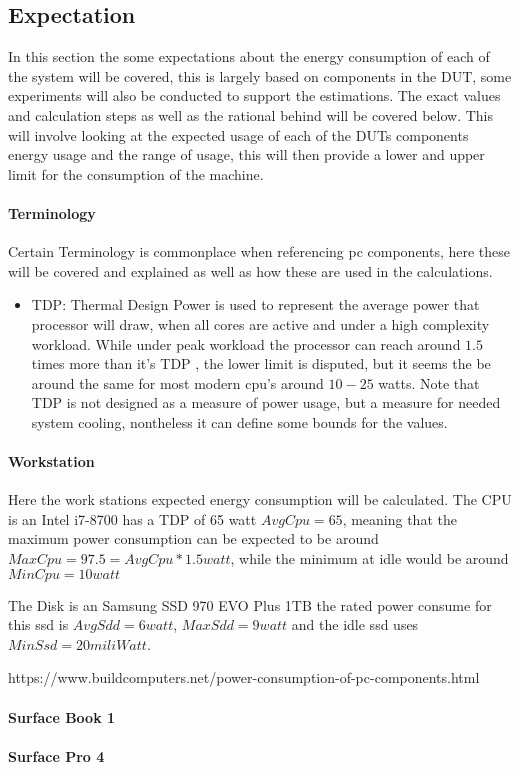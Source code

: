 \subsection{Expectation}
In this section the some expectations about the energy consumption of each of the system will be covered, this is largely based on components in the DUT, some experiments will also be conducted to support the estimations. The exact values and calculation steps as well as the rational behind will be covered below. This will involve looking at the expected usage of each of the DUTs components energy usage and the range of usage, this will then provide a lower and upper limit for the consumption of the machine.

\paragraph{Terminology}
Certain Terminology is commonplace when referencing pc components, here these will be covered and explained as well as how these are used in the calculations.
\begin{itemize}
    \item TDP: Thermal Design Power is used to represent the average power that processor will draw, when all cores are active and under a high complexity workload. While under peak workload the processor can reach around $1.5$ times more than it's TDP \cite{hennessy2011computer}, the lower limit is disputed, but it seems the be around the same for most modern cpu's around $10-25$ watts. Note that TDP is not designed as a measure of power usage, but a measure for needed system cooling, nontheless it can define some bounds for the values.
\end{itemize}

\paragraph{Workstation}
Here the work stations expected energy consumption will be calculated.
The CPU is an Intel i7-8700 has a TDP of 65 watt $AvgCpu = 65$, meaning that the maximum power consumption can be expected to be around $MaxCpu=97.5=AvgCpu*1.5 watt$, while the minimum at idle would be around $MinCpu=10 watt$

The Disk is an Samsung SSD 970 EVO Plus 1TB the rated power consume for this ssd is $AvgSdd = 6 watt$, $MaxSdd = 9 watt$ and the idle ssd uses $MinSsd = 20 miliWatt$.

https://www.buildcomputers.net/power-consumption-of-pc-components.html

\paragraph{Surface Book 1}

\paragraph{Surface Pro 4}